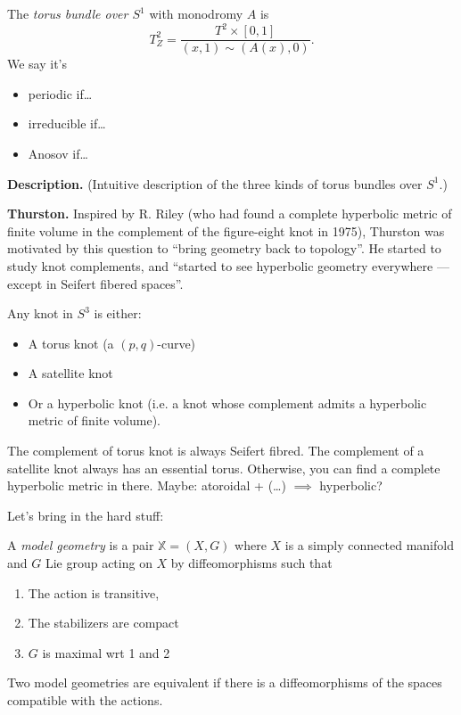 \begin{definition}
\label{definition-torus-bundle}
The {\it torus bundle over $S^1$} 
with monodromy $A$ is
$$
T^2_Z = 
\frac{T^2 \times [0,1]}{(x,1) \sim
(A(x),0)}.
$$
We say it's
\begin{itemize}
\item periodic if…
\item irreducible if…
\item Anosov if…
\end{itemize}
\end{definition}

\noindent
{\bf Description.} (Intuitive description of
the three kinds of torus bundles over
$S^1$.)



\medskip\noindent
{\bf Thurston.} Inspired by R. Riley (who
had found a complete hyperbolic metric of
finite volume in the complement of the
figure-eight knot in 1975), Thurston was
motivated by this question to ``bring
geometry back to topology''. He started to
study knot complements,
and ``started to see hyperbolic geometry
everywhere --- except in Seifert fibered
spaces''.

\begin{theorem}[Thurston]
\label{theorem-thurston}
Any knot in $S^3$ is either:
\begin{itemize}
\item A torus knot (a $(p,q)$-curve)
\item A satellite knot
\item Or a hyperbolic knot (i.e. a knot
whose complement admits a hyperbolic metric
of finite volume).
\end{itemize}
\end{theorem}

\noindent
The complement of torus knot is always
Seifert fibred. The complement of a
satellite knot always has an essential
torus. Otherwise, you can find a complete
hyperbolic metric in there.
Maybe: atoroidal + (…) $\implies $
hyperbolic?

Let's bring in the hard stuff:

\begin{definition}
\label{definition-model-geometry}
A {\it model geometry} is a pair 
$\mathbb{X} = (X,G)$ where $X$ is a simply
connected manifold and $G$ Lie group acting
on $X$ by diffeomorphisms such that
\begin{enumerate}
\item The action is transitive,
\item The stabilizers are compact
\item $G$ is maximal wrt 1 and 2
\end{enumerate}

\noindent
Two model geometries are equivalent if there
is a diffeomorphisms of the spaces
compatible with the actions.
\end{definition}

